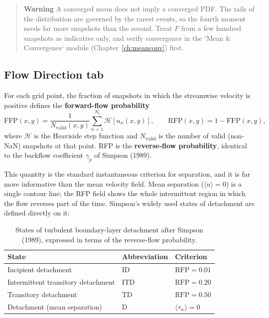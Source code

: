 \begin{quote}
\textbf{Warning}
A converged mean does not imply a converged PDF. The tails of the distribution are governed by the rarest events, so the fourth moment needs far more snapshots than the second. Treat $F$ from a few hundred snapshots as indicative only, and verify convergence in the `Mean \& Convergence` module (Chapter~\ref{ch:meanconv}) first.
\end{quote}

\subsection{Flow Direction tab}

For each grid point, the fraction of snapshots in which the streamwise velocity is positive defines the \textbf{forward-flow probability}
\[
\mathrm{FFP}(x,y) = \frac{1}{N_{\mathrm{valid}}(x,y)} \sum_{n=1}^{N_t} \mathcal{H}\!\left[u_n(x,y)\right],
\qquad
\mathrm{RFP}(x,y) = 1 - \mathrm{FFP}(x,y),
\]
where $\mathcal{H}$ is the Heaviside step function and $N_{\mathrm{valid}}$ is the number of valid (non-NaN) snapshots at that point. RFP is the \textbf{reverse-flow probability}, identical to the backflow coefficient $\gamma_p$ of Simpson (1989).

This quantity is the standard instantaneous criterion for separation, and it is far more informative than the mean velocity field. Mean separation ($\langle u \rangle = 0$) is a single contour line; the RFP field shows the whole intermittent region in which the flow reverses part of the time. Simpson's widely used states of detachment are defined directly on it:

\begin{table}[htbp]
\centering
\caption{States of turbulent boundary-layer detachment after Simpson (1989), expressed in terms of the reverse-flow probability.}
\begin{tabular}{lll}
\toprule
\textbf{State} & \textbf{Abbreviation} & \textbf{Criterion} \\
\midrule
Incipient detachment            & ID  & $\mathrm{RFP} = 0.01$ \\
Intermittent transitory detachment & ITD & $\mathrm{RFP} = 0.20$ \\
Transitory detachment           & TD  & $\mathrm{RFP} = 0.50$ \\
Detachment (mean separation)    & D   & $\langle \tau_w \rangle = 0$ \\
\bottomrule
\end{tabular}
\end{table}

